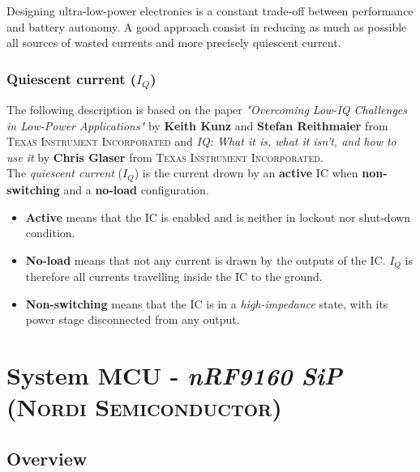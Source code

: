 \documentclass[report.tex]{subfiles}
\begin{document}
Designing ultra-low-power electronics is a constant trade-off between performance and battery autonomy.
A good approach consist in reducing as much as possible all sources of wasted currents and more precisely quiescent current.

\pagebreak

\subsubsection{Quiescent current ($I_Q$)}

The following description is based on the paper \textit{"Overcoming Low-IQ Challenges in
Low-Power Applications"}\cite{lowIqApp} by \textbf{Keith Kunz} and \textbf{Stefan Reithmaier} from \textsc{Texas Instrument Incorporated} and \textit{IQ: What it is, what it isn’t, and how to use it}\cite{IqIntro} by \textbf{Chris Glaser} from \textsc{Texas Instrument Incorporated}.\\

The \textit{quiescent current} ($I_Q$) is the current drown by an \textbf{active} IC when \textbf{non-switching} and a \textbf{no-load} configuration. 
\begin{itemize}
\item \textbf{Active} means that the IC is enabled and is neither in lockout nor shut-down condition. 
\item \textbf{No-load} means that not any current is drawn by the outputs of the IC. $I_Q$ is therefore all currents travelling inside the IC to the ground. 
\item \textbf{Non-switching} means that the IC is in a \textit{high-impedance} state, with its power stage disconnected from any output.
\end{itemize}

\section{System MCU - \textit{nRF9160 SiP}\cite{nrf9160brief} (\textsc{Nordi Semiconductor})}

\subsection{Overview}
\end{document}
